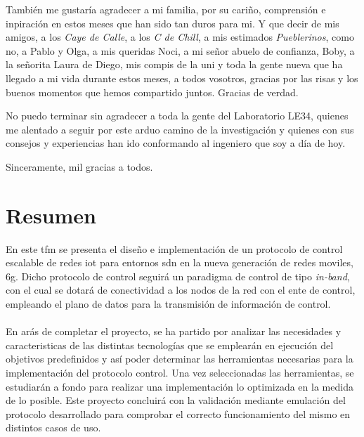 También me gustaría agradecer a mi familia, por su cariño, comprensión e inpiración en estos meses que han sido tan duros para mi. 	Y que decir de mis amigos, a los \textit{Caye de Calle}, a los \textit{C de Chill},  a mis estimados \textit{Pueblerinos}, como no, a Pablo y Olga, a mis queridas Noci, a mi señor abuelo de confianza, Boby, a la señorita Laura de Diego, mis compis de la uni y toda la gente nueva que ha llegado a mi vida durante estos meses, a todos vosotros, gracias por las risas y los buenos momentos que hemos compartido juntos. Gracias de verdad. \newline


No puedo terminar sin agradecer a toda la gente del Laboratorio LE34, quienes me alentado a seguir por este arduo camino de la investigación y quienes con sus consejos y experiencias han ido conformando al ingeniero que soy a día de hoy.

\vspace{0.5cm}

Sinceramente, mil gracias a todos.




\cleardoublepage %



\chapter{Resumen}
\thispagestyle{empty}
En este \gls{tfm} se presenta el diseño e implementación de un protocolo de control escalable de redes \gls{iot} para entornos \gls{sdn} en la nueva generación de redes moviles, \gls{6g}. Dicho protocolo de control seguirá un paradigma de control de tipo \textit{in-band}, con el cual se dotará de conectividad a los nodos de la red con el ente de control, empleando el plano de datos para la transmisión de información de control.\\
\\
En arás de completar el proyecto,  se ha partido por analizar las necesidades y caracteristicas de las distintas tecnologías que se emplearán en ejecución del objetivos predefinidos y así poder determinar las herramientas necesarias para la implementación del protocolo control. Una vez seleccionadas las herramientas, se estudiarán a fondo para realizar una implementación lo optimizada en la medida de lo posible. Este proyecto concluirá con la validación mediante emulación del protocolo desarrollado para comprobar el correcto funcionamiento del mismo en distintos casos de uso.

